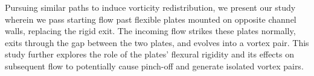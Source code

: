 \documentclass[final,3p,10pt,times,review,authoryear]{elsarticle}
\begin{document}
	Pursuing similar paths to induce vorticity redistribution, we present our study wherein we pass starting flow past flexible plates mounted on opposite channel walls, replacing the rigid exit. The incoming flow strikes these plates normally, exits through the gap between the two plates, and evolves into a vortex pair. This study further explores the role of the plates' flexural rigidity and its effects on subsequent flow to potentially cause pinch-off and generate isolated vortex pairs.
	
\end{document}
